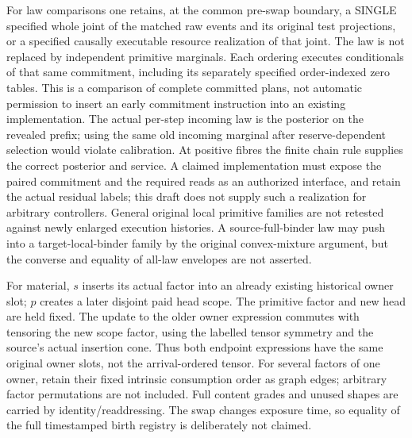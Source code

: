 \documentclass{article}
\begin{document}
For law comparisons one retains, at the common pre-swap boundary, a SINGLE specified whole joint of the matched raw events and its original test projections, or a specified causally executable resource realization of that joint. The law is not replaced by independent primitive marginals. Each ordering executes conditionals of that same commitment, including its separately specified order-indexed zero tables. This is a comparison of complete committed plans, not automatic permission to insert an early commitment instruction into an existing implementation. The actual per-step incoming law is the posterior on the revealed prefix; using the same old incoming marginal after reserve-dependent selection would violate calibration. At positive fibres the finite chain rule supplies the correct posterior and service. A claimed implementation must expose the paired commitment and the required reads as an authorized interface, and retain the actual residual labels; this draft does not supply such a realization for arbitrary controllers. General original local primitive families are not retested against newly enlarged execution histories. A source-full-binder law may push into a target-local-binder family by the original convex-mixture argument, but the converse and equality of all-law envelopes are not asserted.

For material, $s$ inserts its actual factor into an already existing historical owner slot; $p$ creates a later disjoint paid head scope. The primitive factor and new head are held fixed. The update to the older owner expression commutes with tensoring the new scope factor, using the labelled tensor symmetry and the source's actual insertion cone. Thus both endpoint expressions have the same original owner slots, not the arrival-ordered tensor. For several factors of one owner, retain their fixed intrinsic consumption order as graph edges; arbitrary factor permutations are not included. Full content grades and unused shapes are carried by identity/readdressing. The swap changes exposure time, so equality of the full timestamped birth registry is deliberately not claimed.
\end{document}

